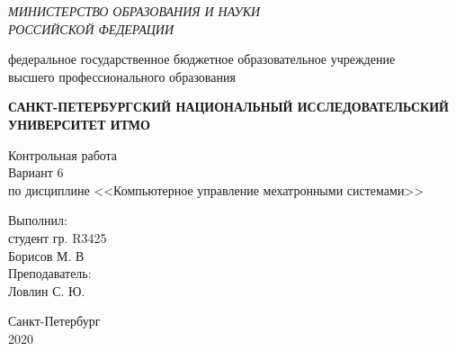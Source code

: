 \begin{titlepage}
	\begin{center}
		\textit{МИНИСТЕРСТВО ОБРАЗОВАНИЯ И НАУКИ\\
		РОССИЙСКОЙ ФЕДЕРАЦИИ}
		\vspace{1ex}
		
		федеральное государственное бюджетное образовательное учреждение\\
		высшего профессионального образования
		\vspace{1ex}
		
		\textbf{САНКТ-ПЕТЕРБУРГСКИЙ НАЦИОНАЛЬНЫЙ ИССЛЕДОВАТЕЛЬСКИЙ УНИВЕРСИТЕТ ИТМО}
		\vspace{10ex}
		
		Контрольная работа\\
        Вариант 6\\
		по дисциплине <<Компьютерное управление мехатронными системами>>\\
	\end{center}
	\vspace{15ex}
	\begin{flushright}
		\noindent
		Выполнил:\\
		студент гр. R3425\\
		Борисов М. В\\
		Преподаватель:\\
		Ловлин С. Ю.
	\end{flushright}
	\vfill
	\begin{center}
		\large Санкт-Петербург\\
		2020\\
	\end{center}
\end{titlepage}